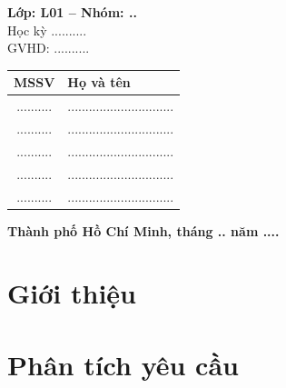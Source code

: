 \documentclass[12pt, a4paper, oneside]{article}
\newcommand{\lop}{L01}
\newcommand{\nhom}{..}
\newcommand{\hocky}{Học kỳ ..........}
\newcommand{\giangvien}{..........}
\newcommand{\noivathoigian}{Thành phố Hồ Chí Minh, tháng .. năm ....}
\begin{document}
\begin{titlepage}
\begin{center}
  \vspace{16pt}
  \textbf{Lớp: \lop{} -- Nhóm: \nhom}\\[4pt]
  \hocky\\[4pt]
  GVHD: \giangvien
\end{center}

\vspace{10pt}
\begin{center}
\small
\renewcommand{\arraystretch}{1.35}
\begin{tabular}{|c|l|}
  \hline
  \textbf{MSSV} & \textbf{Họ và tên} \\ \hline
  .......... & .............................. \\ \hline
  .......... & .............................. \\ \hline
  .......... & .............................. \\ \hline
  .......... & .............................. \\ \hline
  .......... & .............................. \\ \hline
\end{tabular}
\end{center}

\vfill
\centerline{\bfseries \noivathoigian}
\end{titlepage}

\tableofcontents
\newpage
\listoffigures
\newpage
\listoftables

\newpage
{}
\section{Giới thiệu}\label{sec:gioi-thieu}


\newpage
\section{Phân tích yêu cầu}\label{sec:yeu-cau}


\newpage
\end{document}
